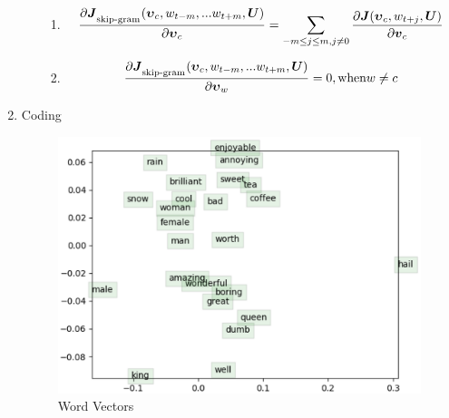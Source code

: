 \documentclass[]{article}
\begin{document}
\begin{enumerate}
\begin{enumerate}
\begin{enumerate}
      \item
	
		\begin{equation}	
		{\partial 		\boldsymbol{J}_\textsubscript{skip-gram}(\boldsymbol{\upsilon}_c, w_{t-m},... w_{t+m}, \boldsymbol{U}) \over \partial \boldsymbol{\upsilon}_{c}} = 
				\sum_{-m \leq j \leq m, j \neq 0} {\partial 		\boldsymbol{J}(\boldsymbol{\upsilon}_c, w_{t+j}, \boldsymbol{U}) \over \partial \boldsymbol{v}_{c}}
		\end{equation}	
			
			\item 
		
		\begin{equation}	
		{\partial 		\boldsymbol{J}_\textsubscript{skip-gram}(\boldsymbol{\upsilon}_c, w_{t-m},... w_{t+m}, \boldsymbol{U}) \over \partial \boldsymbol{\upsilon}_{w}} = 0, 
		\text{when} w \neq c
		\end{equation}
			
    \end{enumerate}
  
	\end{enumerate}

	\item Coding
	
	\begin{figure}
    \centering
    \includegraphics{word_vectors}
    \caption{Word Vectors}
    \label{word_vectors}
	\end{figure}
	
\end{enumerate}
\end{document}
